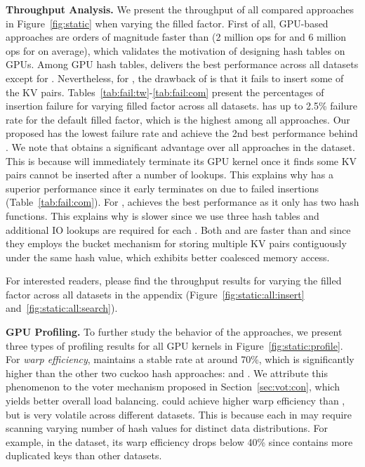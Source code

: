 \vspace{1mm}\noindent\textbf{Throughput Analysis.} We present the throughput of all compared approaches in Figure~\ref{fig:static} when varying the filled factor. 
First of all, GPU-based approaches are orders of magnitude faster than \google (2  million ops for  and 6 million ops for  on average), which validates the motivation of designing hash tables on GPUs. 
Among GPU hash tables, \megakv delivers the best performance across all datasets except for \dsali. Nevertheless, for , the drawback of \megakv is that it fails to insert some of the KV pairs. Tables~\ref{tab:fail:tw}-\ref{tab:fail:com} present the percentages of insertion failure for varying filled factor across all datasets. \megakv has up to 2.5\% failure rate for the default filled factor, which is the highest among all approaches. 
Our proposed \voter has the lowest failure rate and achieve the 2nd best performance behind \megakv. We note that \cudpp obtains a significant advantage over all approaches in the \dsali dataset. This is because \cudpp will immediately terminate its GPU kernel once it finds some KV pairs cannot be inserted after a number of lookups. This explains why \cudpp has a superior performance since it early terminates on \dsali due to failed insertions (Table~\ref{tab:fail:com}). For , \megakv achieves the best performance as it only has two hash functions. This explains why \voter is slower since we use three hash tables and additional IO lookups are required for each . Both \megakv and \voter are faster than \cudpp and \linear since they employs the bucket mechanism for storing multiple KV pairs contiguously under the same hash value, which exhibits better coalesced memory access.  




For interested readers, please find the throughput results for varying the filled factor across all datasets in the appendix (Figure~\ref{fig:static:all:insert} and~\ref{fig:static:all:search}). 





\vspace{1mm}\noindent\textbf{GPU Profiling.} To further study the behavior of the approaches, we present three types of profiling results for all  GPU kernels in Figure~\ref{fig:static:profile}.
For \emph{warp efficiency}, \voter maintains a stable rate at around 70\%, which is significantly higher than the other two cuckoo hash approaches: \megakv and \cudpp.  
We attribute this phenomenon to the voter mechanism proposed in Section~\ref{sec:vot:con}, which yields better overall load balancing. 
\linear could achieve higher warp efficiency than \voter, but is very volatile across different datasets. This is because each  in \linear may require scanning varying number of hash values for distinct data distributions. 
For example, in the \dsali dataset, its warp efficiency drops below 40\% since \dsali contains more duplicated keys than other datasets. 

